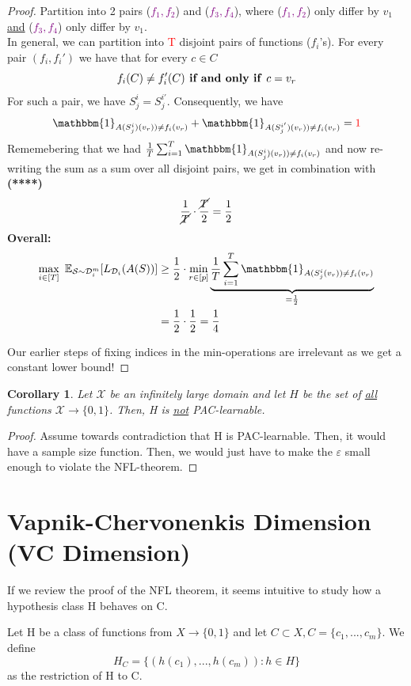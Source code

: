 \documentclass[10pt,a4paper]{article}
\newtheorem{corollary}[theorem]{Corollary}
\theoremstyle{remark}
\theoremstyle{definition}
\theoremstyle{plain}
\begin{document}
\begin{proof}
Partition into 2 pairs (\textcolor{purple}{$f_1, f_2$}) and (\textcolor{purple}{$f_3, f_4$}), where (\textcolor{purple}{$f_1, f_2$}) only differ by $v_1$ \underline{and} (\textcolor{purple}{$f_3, f_4$}) only differ by $v_1$.\\
In general, we can partition into \textcolor{red}{T} disjoint pairs of functions ($f_i$'s). For every pair $(f_i, f_i')$ we have that for every $c \in C$
$$
	f_i(C) \neq f_i'(C) \text{\textbf{ if and only if }} c = v_r
$$
For such a pair, we have $S_j^{i} = S_{j}^{i'}$. Consequently, we have 
$$
	\mathbbm{1}_{A(S_j^i)(v_r)) \neq f_i(v_r)} + \mathbbm{1}_{A(S_j^{i'})(v_r)) \neq f_i(v_r)} = \textcolor{red}{1}
$$
Rememebering that we had $\frac{1}{T} \sum_{i=1}^{T} \mathbbm{1}_{A(S_j^i)(v_r)) \neq f_i(v_r)}$ and now re-writing the sum as a  sum over all disjoint pairs, we get in combination with \textbf{(****)}
$$
 \frac{1}{\cancel{T}} \cdot \frac{\cancel{T}}{2} = \frac{1}{2}
$$
\textbf{Overall:}
\begin{align*}
	\max_{i \in [T]} \ \mathbb{E}_{\mathcal{S} \sim \mathcal{D}_i^m}[L_{\mathcal{D}_i}(A(S))]  &\geq \frac{1}{2} \cdot  \min_{r \in [p]} \underbrace{\frac{1}{T} \sum_{i=1}^{T} \mathbbm{1}_{A(S_j^i(v_r)) \neq f_i(v_r)}}_{\mathclap{ = \frac{1}{2}}}\\
	&= \frac{1}{2} \cdot \frac{1}{2} = \frac{1}{4}
\end{align*}

Our earlier steps of fixing indices in the min-operations are irrelevant as we get a constant lower bound!
\end{proof}
\begin{corollary}
	 Let $\mathcal{X}$ be an infinitely large domain and let $H$ be the set of \underline{all} functions $\mathcal{X} \to \{0,1\}$. Then, H is \underline{not} PAC-learnable.
\end{corollary}
\begin{proof} Assume towards contradiction that H is PAC-learnable. Then, it would have a sample size function. Then, we would just have to make the $\varepsilon$ small enough to violate the NFL-theorem.
\end{proof}

\section{Vapnik-Chervonenkis Dimension (VC Dimension)}
If we review the proof of the NFL theorem, it seems intuitive to study how a hypothesis class H behaves on C.
\begin{boxeddef}
	Let H be a class of functions from $X \to \{0,1\}$ and let $C \subset X, C = \{c_1, ..., c_m \}$. We define 
	$$ H_C = \{ (h(c_1), ..., h(c_m)): h \in H\} $$
	as the restriction of H to C.
\end{boxeddef}
\end{document}
